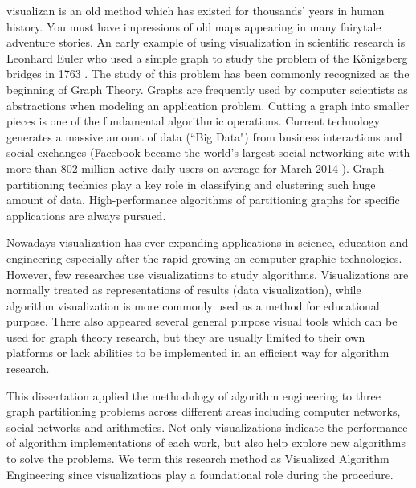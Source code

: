 
visualizan is an old method which has existed for thousands' years in human history.  You must have impressions of old maps appearing in many fairytale adventure stories. An early example of using visualization in scientific research is Leonhard Euler who used a simple graph to study the problem of the Königsberg bridges in 1763 \cite{biggs1986graph}. The study of this problem has been commonly recognized as the beginning of Graph Theory. Graphs are frequently used by computer scientists as abstractions when modeling an application problem. Cutting a graph into smaller pieces is one of the fundamental algorithmic operations. Current technology generates a massive amount of data (``Big Data") from business interactions and social exchanges (Facebook became the world's largest social networking site with more than 802 million active daily users on average for March 2014 \cite{bright2015too}). Graph partitioning technics play a key role in classifying and clustering such huge amount of data. High-performance algorithms of partitioning graphs for specific applications are always pursued.

Nowadays visualization has ever-expanding applications in science, education and engineering especially after the rapid growing on computer graphic technologies. However, few researches use visualizations to study algorithms. Visualizations are normally treated as representations of results (data visualization), while algorithm visualization is more commonly used as a method for educational purpose. There also appeared several general purpose visual tools which can be used for graph theory research, but they are usually limited to their own platforms or lack abilities to be implemented in an efficient way for algorithm research.
 
This dissertation applied the methodology of algorithm engineering to three graph partitioning problems across different areas including computer networks, social networks and arithmetics.  Not only visualizations indicate the performance of algorithm implementations of each work, but also help explore new algorithms to solve the problems. We term this research method as Visualized Algorithm Engineering since visualizations play a foundational role during the procedure.